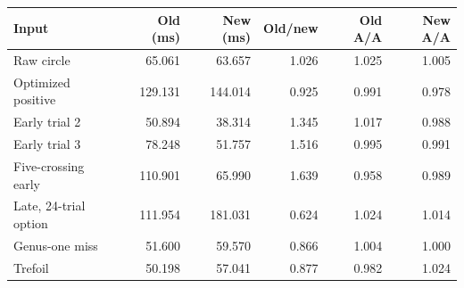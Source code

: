 \begin{tabular}{lrrrrr}
\toprule
Input & Old (ms) & New (ms) & Old/new & Old A/A & New A/A \\
\midrule
Raw circle & 65.061 & 63.657 & 1.026 & 1.025 & 1.005 \\
Optimized positive & 129.131 & 144.014 & 0.925 & 0.991 & 0.978 \\
Early trial 2 & 50.894 & 38.314 & 1.345 & 1.017 & 0.988 \\
Early trial 3 & 78.248 & 51.757 & 1.516 & 0.995 & 0.991 \\
Five-crossing early & 110.901 & 65.990 & 1.639 & 0.958 & 0.989 \\
Late, 24-trial option & 111.954 & 181.031 & 0.624 & 1.024 & 1.014 \\
Genus-one miss & 51.600 & 59.570 & 0.866 & 1.004 & 1.000 \\
Trefoil & 50.198 & 57.041 & 0.877 & 0.982 & 1.024 \\
\bottomrule
\end{tabular}
